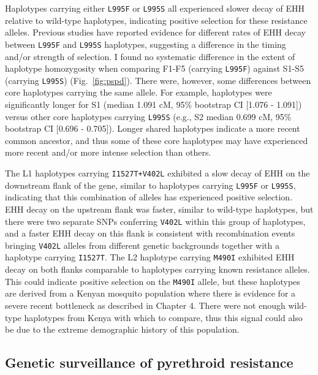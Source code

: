 \documentclass[a4paper,11pt,abstracton,hidelinks]{scrartcl}
\begin{document}
Haplotypes carrying either \texttt{L995F} or \texttt{L995S} all experienced slower decay of EHH relative to wild-type haplotypes, indicating positive selection for these resistance alleles.
%
Previous studies have reported evidence for different rates of EHH decay between \texttt{L995F} and \texttt{L995S} haplotypes, suggesting a difference in the timing and/or strength of selection.
%
I found no systematic difference in the extent of haplotype homozygosity when comparing F1-F5 (carrying \texttt{L995F}) against S1-S5 (carrying \texttt{L995S}) (Fig.~\ref{fig:pspd}).
%
There were, however, some differences between core haplotypes carrying the same allele.
%
For example, haplotypes were significantly longer for S1 (median 1.091 cM, 95\% bootstrap CI [1.076 - 1.091]) versus other core haplotypes carrying \texttt{L995S} (e.g., S2 median 0.699 cM, 95\% bootstrap CI [0.696 - 0.705]).
%
Longer shared haplotypes indicate a more recent common ancestor, and thus some of these core haplotypes may have experienced more recent and/or more intense selection than others.


The L1 haplotypes carrying \texttt{I1527T+V402L} exhibited a slow decay of EHH on the downstream flank of the gene, similar to haplotypes carrying \texttt{L995F} or \texttt{L995S}, indicating that this combination of alleles has experienced positive selection.
%
EHH decay on the upstream flank was faster, similar to wild-type haplotypes, but there were two separate SNPs conferring \texttt{V402L} within this group of haplotypes, and a faster EHH decay on this flank is consistent with recombination events bringing \texttt{V402L} alleles from different genetic backgrounds together with a haplotype carrying \texttt{I1527T}.
%
The L2 haplotype carrying \texttt{M490I} exhibited EHH decay on both flanks comparable to haplotypes carrying known resistance alleles.
%
This could indicate positive selection on the \texttt{M490I} allele, but these haplotypes are derived from a Kenyan mosquito population where there is evidence for a severe recent bottleneck as described in Chapter 4.
%
There were not enough wild-type haplotypes from Kenya with which to compare, thus this signal could also be due to the extreme demographic history of this population.


\subsection{Genetic surveillance of pyrethroid resistance}\label{subsec:results-tracking}
\end{document}
